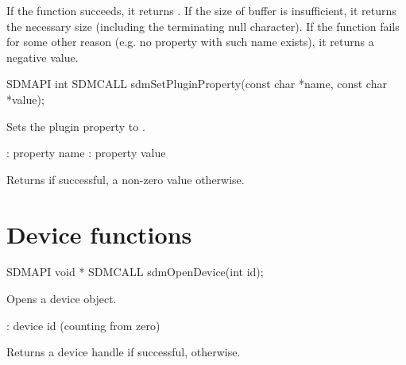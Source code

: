 \documentclass[a4paper,12pt,twoside,extrafontsizes]{memoir}
\begin{document}
\begin{funcret}
	If the function succeeds, it returns . If the size of buffer is insufficient, it returns the necessary size (including the terminating null character). If the function fails for some other reason (e.g. no property with such name exists), it returns a negative value.
\end{funcret}



\begin{cfuncprototype}
SDMAPI int SDMCALL sdmSetPluginProperty(const char *name, const char *value);
\end{cfuncprototype}

\begin{funcdescr}
	Sets the plugin property  to .
\end{funcdescr}

\begin{funcparams}
	: property name
	: property value
\end{funcparams}

\begin{funcret}
	Returns  if successful, a non-zero value otherwise.
\end{funcret}

\section{Device functions}



\begin{cfuncprototype}
SDMAPI void * SDMCALL sdmOpenDevice(int id);
\end{cfuncprototype}

\begin{funcdescr}
	Opens a device object.
\end{funcdescr}

\begin{funcparams}
	: device id (counting from zero)
\end{funcparams}

\begin{funcret}
	Returns a device handle if successful,  otherwise.
\end{funcret}
\end{document}
